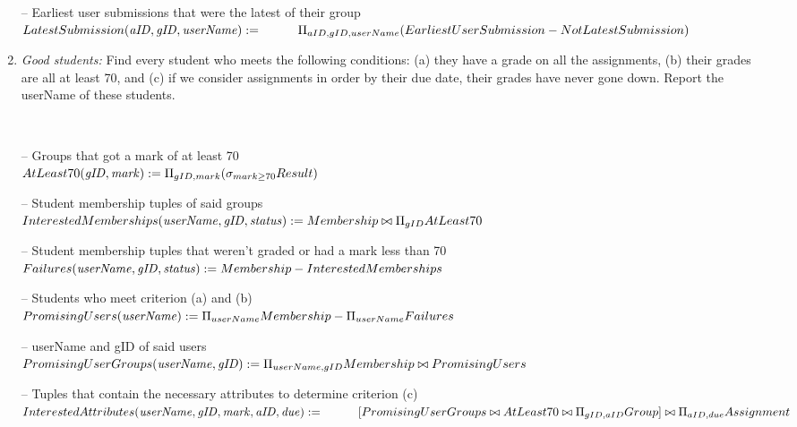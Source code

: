 \documentclass{article}
\newcommand{\var}[1]{\mathit{#1}}
\begin{document}
\begin{enumerate}
{-- Earliest user submissions that were the latest of their group \\[5pt]
$
LatestSubmission(\var{aID, gID, userName}) := \\[5pt]
    \hspace*{1cm}
    \Pi_{aID, gID, userName}
	(EarliestUserSubmission - NotLatestSubmission) \\[10pt]
$
} %

\newpage

\item   %
\textit{Good students:}
Find every student who meets the following conditions:
(a) they have a grade on all the assignments,
(b) their grades are all at least 70, and
(c) if we consider assignments in order by their due date, their grades have never gone down.
Report the userName of these students.

{~}\\ %
{\large %
-- Groups that got a mark of at least 70 \\[5pt]
$
AtLeast70(\var{gID, mark}) :=
    \Pi_{gID, mark}
	(\sigma_{mark \geq 70}
	Result) \\[10pt]
$

-- Student membership tuples of said groups \\[5pt]
$
InterestedMemberships(\var{userName, gID, status}) :=
    Membership \bowtie \Pi_{gID} AtLeast70 \\[10pt]
$

-- Student membership tuples that weren't graded or had a mark less than 70 \\[5pt]
$
Failures(\var{userName, gID, status}) :=
    Membership - InterestedMemberships \\[10pt]
$

-- Students who meet criterion (a) and (b) \\[5pt]
$
PromisingUsers(\var{userName}) :=
    \Pi_{userName} Membership - \Pi_{userName} Failures \\[10pt]
$

-- userName and gID of said users \\[5pt]
$
PromisingUserGroups(\var{userName, gID}) :=
    \Pi_{userName, gID} Membership \bowtie PromisingUsers \\[10pt]
$

-- Tuples that contain the necessary attributes to determine criterion (c) \\[5pt]
$
InterestedAttributes(\var{userName, gID, mark, aID, due}) := \\[5pt]
    \hspace*{1cm}
	[PromisingUserGroups \bowtie AtLeast70 \bowtie \Pi_{gID, aID} Group] \bowtie \Pi_{aID, due} Assignment \\[10pt]
$

}
\end{enumerate}
\end{document}
